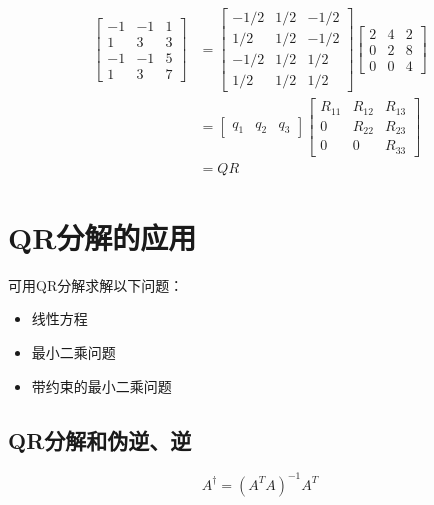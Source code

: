 \begin{example}
    $$
\begin{aligned}
\left[\begin{array}{rrr}
-1 & -1 & 1 \\
1 & 3 & 3 \\
-1 & -1 & 5 \\
1 & 3 & 7
\end{array}\right] &=\left[\begin{array}{rrr}
-1 / 2 & 1 / 2 & -1 / 2 \\
1 / 2 & 1 / 2 & -1 / 2 \\
-1 / 2 & 1 / 2 & 1 / 2 \\
1 / 2 & 1 / 2 & 1 / 2
\end{array}\right]\left[\begin{array}{rrr}
2 & 4 & 2 \\
0 & 2 & 8 \\
0 & 0 & 4
\end{array}\right] \\
&=\left[\begin{array}{lll}
q_{1} & q_{2} & q_{3}
\end{array}\right]\left[\begin{array}{ccc}
R_{11} & R_{12} & R_{13} \\
0 & R_{22} & R_{23} \\
0 & 0 & R_{33}
\end{array}\right] \\
&=Q R
\end{aligned}
$$
\end{example}

\section{QR分解的应用}

可用QR分解求解以下问题：

\begin{itemize}
    \item 线性方程
    \item 最小二乘问题
    \item 带约束的最小二乘问题
\end{itemize}

\subsection{QR分解和伪逆、逆}

\begin{definition}
    $$A^{\dagger}=\left(A^{T} A\right)^{-1} A^{T}$$
\end{definition}

